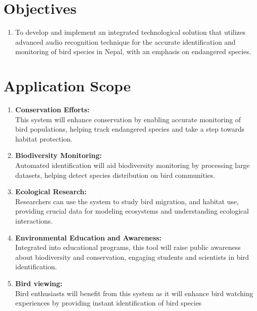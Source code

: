 \section{Objectives}
\begin{enumerate}[label=\roman*]
    \item To develop and implement an integrated technological solution that utilizes
          advanced audio recognition technique for the accurate identification and
          monitoring of bird species in Nepal, with an emphasis on endangered species.
\end{enumerate}

\section{Application Scope}
\begin{enumerate}
    \item \textbf{Conservation Efforts:}\\This system will enhance conservation
          by enabling accurate monitoring
          of bird populations, helping track endangered species and take a step
          towards habitat protection.
    \item \textbf{Biodiversity Monitoring:}\\Automated identification will aid
          biodiversity monitoring by
          processing large datasets, helping detect species distribution on
          bird communities.
    \item \textbf{Ecological Research:}\\ Researchers can use the system to
          study bird migration,
          and habitat use, providing crucial data for modeling ecosystems and
          understanding ecological interactions.
    \item \textbf{Environmental Education and Awareness:}\\Integrated into
          educational programs, this tool will
          raise public awareness about biodiversity and conservation, engaging
          students and scientists in bird identification.
    \item \textbf{Bird viewing:}\\Bird enthusiasts will benefit from this
          system as it will enhance bird watching
          experiences by providing instant identification of bird species
\end{enumerate}
